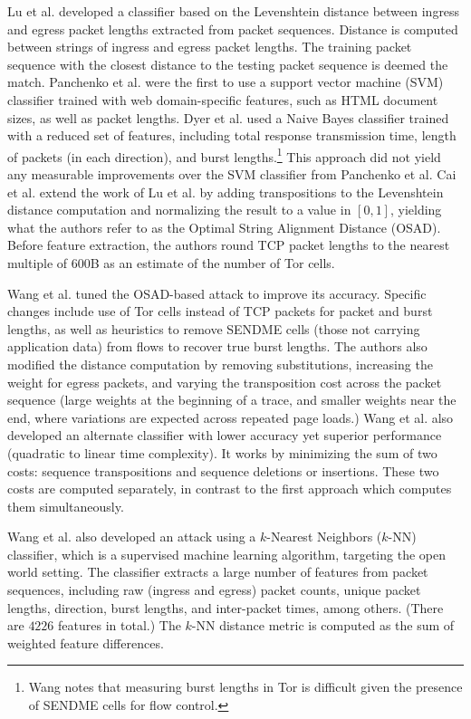 \documentclass[runningheads]{llncs}
\begin{document}
Lu et al. \cite{lu2010website} developed a classifier based on the Levenshtein distance between
ingress and egress packet lengths extracted from packet sequences. Distance is computed between
strings of ingress and egress packet lengths. The training packet sequence with the closest
distance to the testing packet sequence is deemed the match. Panchenko et al. \cite{panchenko2011website}
were the first to use a support vector machine (SVM) classifier trained with web domain-specific
features, such as HTML document sizes, as well as packet lengths. Dyer et al. \cite{dyer2012peek}
used a Naive Bayes classifier trained with a reduced set of features, including total
response transmission time, length of packets (in each direction), and burst lengths.\footnote{Wang
\cite{wang2016website} notes that measuring burst lengths in Tor is difficult given the presence of
SENDME cells for flow control.} This approach did not yield any measurable improvements over
the SVM classifier from Panchenko et al. Cai et al. \cite{cai2012touching} extend the work of Lu et al.
by adding transpositions to the Levenshtein distance computation and normalizing the result to
a value in $[0,1]$, yielding what the authors refer to as the Optimal String Alignment Distance
(OSAD). Before feature extraction, the authors round TCP packet lengths to the nearest multiple of
$600$B as an estimate of the number of Tor cells.

Wang et al. \cite{wang2013improved} tuned the OSAD-based attack to improve its accuracy. Specific changes
include use of Tor cells instead of TCP packets for packet and burst lengths, as well as heuristics
to remove SENDME cells (those not carrying application data) from flows to recover true
burst lengths. The authors also modified the distance computation by removing substitutions,
increasing the weight for egress packets, and varying the transposition cost across the packet
sequence (large weights at the beginning of a trace, and smaller weights near the end, where
variations are expected across repeated page loads.) Wang et al. also developed an alternate classifier
with lower accuracy yet superior performance (quadratic to linear time complexity). It works by
minimizing the sum of two costs: sequence transpositions and sequence deletions or insertions. These
two costs are computed separately, in contrast to the first approach which computes them simultaneously.

Wang et al. \cite{wang2014effective} also developed an attack using a $k$-Nearest Neighbors ($k$-NN) classifier,
which is a supervised machine learning algorithm, targeting the open world setting. The classifier
extracts a large number of features from packet sequences, including raw (ingress and egress)
packet counts, unique packet lengths, direction, burst lengths, and inter-packet times, among others.
(There are $4226$ features in total.) The $k$-NN distance metric is computed as the sum of weighted
feature differences.
\end{document}
